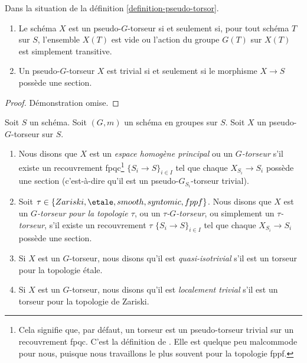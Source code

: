 \begin{lemma}
\label{lemma-characterize-trivial-pseudo-torsors}
Dans la situation de la
définition \ref{definition-pseudo-torsor}.
\begin{enumerate}
\item Le schéma $X$ est un pseudo-$G$-torseur si et seulement si, pour tout schéma
$T$ sur $S$, l'ensemble $X(T)$ est vide ou l'action du groupe $G(T)$
sur $X(T)$ est simplement transitive.
\item Un pseudo-$G$-torseur $X$ est trivial si et seulement si le morphisme
$X \to S$ possède une section.
\end{enumerate}
\end{lemma}

\begin{proof}
Démonstration omise.
\end{proof}

\begin{definition}
\label{definition-principal-homogeneous-space}
Soit $S$ un schéma.
Soit $(G, m)$ un schéma en groupes sur $S$.
Soit $X$ un pseudo-$G$-torseur sur $S$.
\begin{enumerate}
\item Nous disons que $X$ est un {\it espace homogène principal}
ou un {\it $G$-torseur} s'il existe un recouvrement fpqc\footnote{Cela signifie
que, par défaut, un torseur est un pseudo-torseur trivial sur un
recouvrement fpqc. C'est la définition de \cite[Expos\'e IV, 6.5]{SGA3}.
Elle est quelque peu malcommode pour nous, puisque nous travaillons le plus souvent pour la
topologie fppf.}
$\{S_i \to S\}_{i \in I}$ tel que chaque
$X_{S_i} \to S_i$ possède une section (c'est-à-dire qu'il est un pseudo-$G_{S_i}$-torseur trivial).
\item Soit $\tau \in\allowbreak \{Zariski,\allowbreak \etale,\allowbreak smooth,\allowbreak syntomic,\allowbreak fppf\}$.
Nous disons que $X$ est un {\it $G$-torseur pour la topologie $\tau$}, ou un
{\it $\tau$-$G$-torseur}, ou simplement un {\it $\tau$-torseur},
s'il existe un recouvrement $\tau$ $\{S_i \to S\}_{i \in I}$
tel que chaque $X_{S_i} \to S_i$ possède une section.
\item Si $X$ est un $G$-torseur, nous disons qu'il est
{\it quasi-isotrivial} s'il est un torseur pour la topologie \'etale.
\item Si $X$ est un $G$-torseur, nous disons qu'il est
{\it localement trivial} s'il est un torseur pour la topologie de Zariski.
\end{enumerate}
\end{definition}

